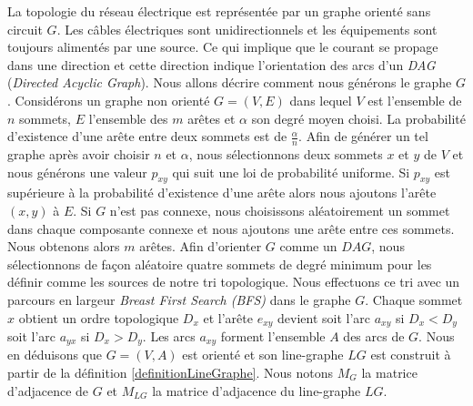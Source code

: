 La topologie du r\'eseau \'electrique est repr\'esent\'ee par un graphe orient\'e sans circuit $G$.
Les c\^ables \'electriques sont unidirectionnels et les \'equipements sont toujours aliment\'es par une source. Ce qui implique que le courant se propage dans une direction et cette direction  indique l'orientation des arcs d'un {\em DAG} ({\em Directed Acyclic Graph}).
Nous allons d\'ecrire comment nous g\'en\'erons le graphe $G$.
\newline
Consid\'erons un graphe non orient\'e $G=(V, E)$ dans lequel  $V$ est l'ensemble de $n$ sommets, $E$ l'ensemble des $m$ ar\^etes et $\alpha$ son degr\'e moyen choisi. 
La probabilit\'e d'existence d'une ar\^ete entre deux sommets est de $\frac{\alpha}{n}$. 
Afin de g\'en\'erer un tel graphe apr\`es avoir choisir $n$ et $\alpha$, nous s\'electionnons  deux sommets $x$ et $y$ de $V$ et nous g\'en\'erons une valeur $p_{xy}$ qui suit  une loi de probabilit\'e uniforme.
Si $p_{xy}$ est sup\'erieure \`a la probabilit\'e d'existence d'une ar\^ete alors nous ajoutons l'ar\^ete $(x,y)$ \`a $E$.
\newline
Si $G$ n'est pas connexe, nous choisissons al\'eatoirement un sommet dans chaque composante connexe et nous ajoutons une ar\^ete entre ces sommets.  Nous obtenons alors  $m$ ar\^etes.
\newline
Afin d'orienter $G$ comme un $DAG$, nous s\'electionnons de fa\c con al\'eatoire quatre sommets  de degr\'e minimum pour les d\'efinir comme les sources de notre tri topologique.
Nous effectuons ce tri avec un parcours en largeur {\em Breast First Search (BFS)} dans le graphe $G$. 
Chaque sommet $x$ obtient un ordre topologique $D_x$ et l'ar\^ete $e_{xy}$ devient 
soit l'arc $a_{xy}$ si $D_x < D_y$ 
soit l'arc $a_{yx}$ si $D_x > D_y$. 
Les arcs $a_{xy}$ forment l'ensemble $A$ des arcs de $G$. 
Nous en d\'eduisons que $G=(V, A)$ est orient\'e et son line-graphe $LG$ est construit \`a partir de la d\'efinition \ref{definitionLineGraphe}.
\newline
Nous notons $M_{G}$  la matrice d'adjacence de $G$ et $M_{LG}$ la matrice d'adjacence du line-graphe $LG$.
